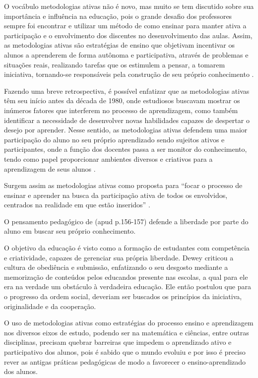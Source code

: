 O vocábulo metodologias ativas não é novo, mas muito se tem discutido sobre sua importância e influência na educação, pois o grande desafio dos professores sempre foi encontrar e utilizar um método de como ensinar para manter ativa a participação e o envolvimento dos discentes no desenvolvimento das aulas. Assim, as metodologias ativas são estratégias de ensino que objetivam incentivar os alunos a aprenderem de forma autônoma e participativa, através de problemas e situações reais, realizando tarefas que os estimulem a pensar, a tomarem iniciativa, tornando-se responsáveis pela construção de seu próprio conhecimento \cite[p. 12]{DIESEL2017}.

Fazendo uma breve retrospectiva, é possível enfatizar que as metodologias ativas têm seu início antes da década de 1980, onde estudiosos buscavam mostrar os inúmeros fatores que interferem no processo de aprendizagem, como também identificar a necessidade de desenvolver novas habilidades capazes de despertar o desejo por aprender. Nesse sentido, as metodologias ativas defendem uma maior participação do aluno no seu próprio aprendizado sendo sujeitos ativos e participantes, onde a função dos docentes passa a ser monitor do conhecimento, tendo como papel proporcionar ambientes diversos e criativos para a aprendizagem de seus alunos \cite[p. 263]{Mota2018}.

Surgem assim as metodologias ativas como proposta para ``focar o processo de ensinar e aprender na busca da participação ativa de todos os envolvidos, centrados na realidade em que estão inseridos'' \cite[p. 66]{FIALHO2017}.

O pensamento pedagógico de  (apud \cite{LOVATO2018} p.156-157) defende a liberdade por parte do aluno em buscar seu próprio conhecimento.

\begin{citacao}
    O objetivo da educação é visto como a formação de estudantes com competência e criatividade, capazes de gerenciar sua própria liberdade. Dewey criticou a cultura de obediência e submissão, enfatizando o seu desgosto mediante a memorização de conteúdos pelos educandos presente nas escolas, a qual para ele era na verdade um obstáculo à verdadeira educação. Ele então postulou que para o progresso da ordem social, deveriam ser buscados os princípios da iniciativa, originalidade e da cooperação.
\end{citacao}

O uso de metodologias ativas como estratégias do processo ensino e aprendizagem nos diversos eixos de estudo, podendo ser na matemática e ciências, entre outras disciplinas, precisam quebrar barreiras que impedem o aprendizado ativo e participativo dos alunos, pois é sabido que o mundo evoluiu e por isso é preciso rever as antigas práticas pedagógicas de modo a favorecer o ensino-aprendizado dos alunos.

